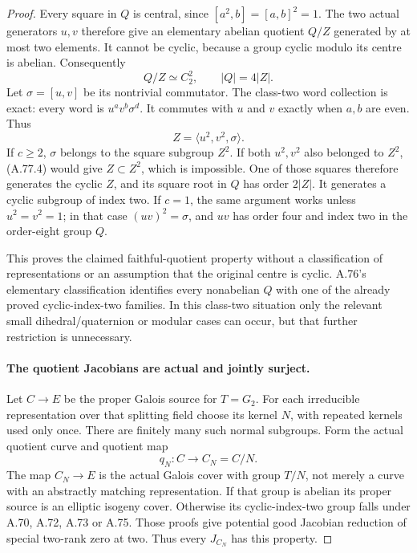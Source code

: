 \begin{proof}
Every square in \(Q\) is central, since
\([a^2,b]=[a,b]^2=1\). The two actual generators
\(u,v\) therefore give an elementary abelian quotient
\(Q/Z\) generated by at most two elements. It cannot
be cyclic, because a group cyclic modulo its centre
is abelian. Consequently
\[
                Q/Z\simeq C_2^2,\qquad |Q|=4|Z|.
                                                        \tag{A.77.3}
\]
Let \(\sigma=[u,v]\) be its nontrivial commutator.
The class-two word collection is exact: every word
is \(u^a v^b\sigma^d\). It commutes with \(u\)
and \(v\) exactly when \(a,b\) are even. Thus
\[
                         Z=\langle u^2,v^2,\sigma\rangle.
                                                        \tag{A.77.4}
\]
If \(c\ge2\), \(\sigma\) belongs to the square
subgroup \(Z^2\). If both \(u^2,v^2\) also belonged
to \(Z^2\), (A.77.4) would give \(Z\subset Z^2\),
which is impossible. One of those squares therefore
generates the cyclic \(Z\), and its square root in
\(Q\) has order \(2|Z|\). It generates a cyclic
subgroup of index two. If \(c=1\), the same argument
works unless \(u^2=v^2=1\); in that case
\((uv)^2=\sigma\), and \(uv\) has order four and
index two in the order-eight group \(Q\).

This proves the claimed faithful-quotient property
without a classification of representations or an
assumption that the original centre is cyclic.
A.76's elementary classification identifies every
nonabelian \(Q\) with one of the already proved
cyclic-index-two families. In this class-two situation
only the relevant small dihedral/quaternion or modular
cases can occur, but that further restriction is unnecessary.

\paragraph{The quotient Jacobians are actual and jointly surject.}
Let \(C\to E\) be the proper Galois source for \(T=G_2\).
For each irreducible representation over that splitting field choose its
kernel \(N\), with repeated kernels used only once.
There are finitely many such normal subgroups. Form the
actual quotient curve and quotient map
\[
                    q_N:C\longrightarrow C_N=C/N.
                                                        \tag{A.77.5}
\]
The map \(C_N\to E\) is the actual Galois cover
with group \(T/N\), not merely a curve with an
abstractly matching representation. If that group is
abelian its proper source is an elliptic isogeny cover.
Otherwise its cyclic-index-two group falls under A.70,
A.72, A.73 or A.75. Those proofs give potential good
Jacobian reduction of special two-rank zero at two.
Thus every \(J_{C_N}\) has this property.


\end{proof}
